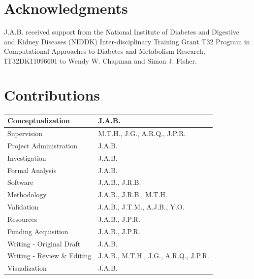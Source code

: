 \documentclass[11pt, a4paper, oneside]{article}
\begin{document}
\section*{Acknowledgments}
J.A.B. received support from the National Institute of Diabetes and Digestive and Kidney Diseases (NIDDK) Inter-disciplinary Training Grant T32 Program in Computational Approaches to Diabetes and Metabolism Research, 1T32DK11096601 to Wendy W. Chapman and Simon J. Fisher.


\section*{Contributions}
\begin{tabular}{ l l }
 Conceptualization & J.A.B. \\
 \hline
 Supervision & M.T.H., J.G., A.R.Q., J.P.R. \\
 \hline
 Project Administration & J.A.B. \\
 \hline
 Investigation & J.A.B. \\
 \hline
 Formal Analysis & J.A.B. \\
 \hline
 Software & J.A.B., J.R.B. \\
 \hline
 Methodology & J.A.B., J.R.B., M.T.H. \\
 \hline
 Validation & J.A.B., J.T.M., A.J.B., Y.O. \\
 \hline
 Resources & J.A.B., J.P.R. \\
 \hline
 Funding Acquisition & J.A.B., J.P.R. \\
 \hline
 Writing - Original Draft & J.A.B. \\
 \hline
 Writing - Review \& Editing & J.A.B., M.T.H., J.G., A.R.Q., J.P.R. \\
 \hline
 Visualization & J.A.B.
\end{tabular}





\end{document}

